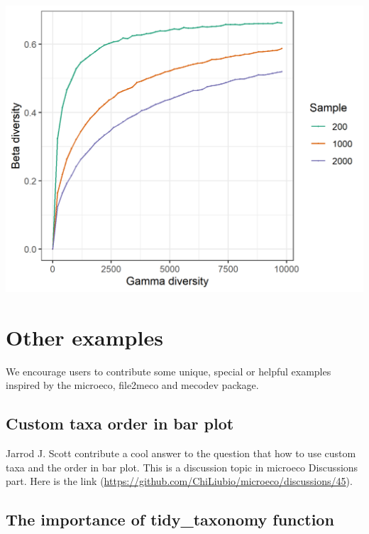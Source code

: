 \documentclass[
]{book}
\begin{document}
\begin{center}\includegraphics[width=600px]{Images/plot_gamma_simu} \end{center}

\hypertarget{other-examples}{%
\chapter{Other examples}\label{other-examples}}

We encourage users to contribute some unique, special or helpful examples inspired by the microeco, file2meco and mecodev package.

\hypertarget{custom-taxa-order-in-bar-plot}{%
\section{Custom taxa order in bar plot}\label{custom-taxa-order-in-bar-plot}}

Jarrod J. Scott contribute a cool answer to the question that how to use custom taxa and the order in bar plot.
This is a discussion topic in microeco Discussions part. Here is the link (\url{https://github.com/ChiLiubio/microeco/discussions/45}).

\hypertarget{the-importance-of-tidy_taxonomy-function}{%
\section{The importance of tidy\_taxonomy function}\label{the-importance-of-tidy_taxonomy-function}}
\end{document}
